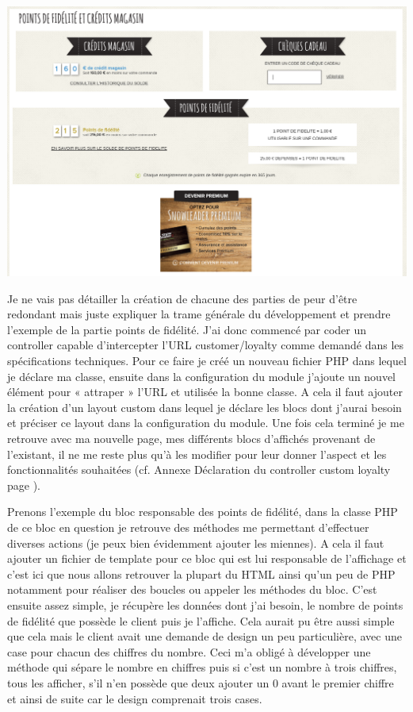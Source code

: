 \documentclass[a4paper,11pt,twoside]{report}
\begin{document}
	\begin{center}
	  \includegraphics[width=\textwidth]{images/SL_loyalty_page1.png} 
	  \label{SL_loyalty_page1}
	\end{center}
	
    	Je ne vais pas détailler la création de chacune des parties de peur d'être redondant mais juste expliquer la trame générale du développement et prendre l'exemple de la partie points de fidélité. J'ai donc commencé par coder un controller capable d'intercepter l'URL customer/loyalty comme demandé dans les spécifications techniques. Pour ce faire je créé un nouveau fichier PHP dans lequel je déclare ma classe, ensuite dans la configuration du module j'ajoute un nouvel élément pour  « attraper » l'URL et utilisée la bonne classe. A cela il faut ajouter la création d'un layout custom dans lequel je déclare les blocs dont j'aurai besoin et préciser ce layout dans la configuration du module. Une fois cela terminé je me retrouve avec ma nouvelle page, mes différents blocs d'affichés provenant de l'existant, il ne me reste plus qu'à les modifier pour leur donner l'aspect et les fonctionnalités souhaitées (cf. Annexe Déclaration du controller custom loyalty page \pageref{SL_loyalty_controller}).
	
	Prenons l'exemple du bloc responsable des points de fidélité, dans la classe PHP de ce bloc en question je retrouve des méthodes me permettant d'effectuer diverses actions (je peux bien évidemment ajouter les miennes). A cela il faut ajouter un fichier de template pour ce bloc qui est lui responsable de l'affichage et c'est ici que nous allons retrouver la plupart du HTML ainsi qu'un peu de PHP notamment pour réaliser des boucles ou appeler les méthodes du bloc. C'est ensuite assez simple, je récupère les données dont j'ai besoin, le nombre de points de fidélité que possède le client puis je l'affiche. Cela aurait pu être aussi simple que cela mais le client avait une demande de design un peu particulière, avec une case pour chacun des chiffres du nombre. Ceci m'a obligé à développer une méthode qui sépare le nombre en chiffres puis si c'est un nombre à trois chiffres, tous les afficher, s'il n'en possède que deux ajouter un 0 avant le premier chiffre et ainsi de suite car le design comprenait trois cases.
    
\end{document}
